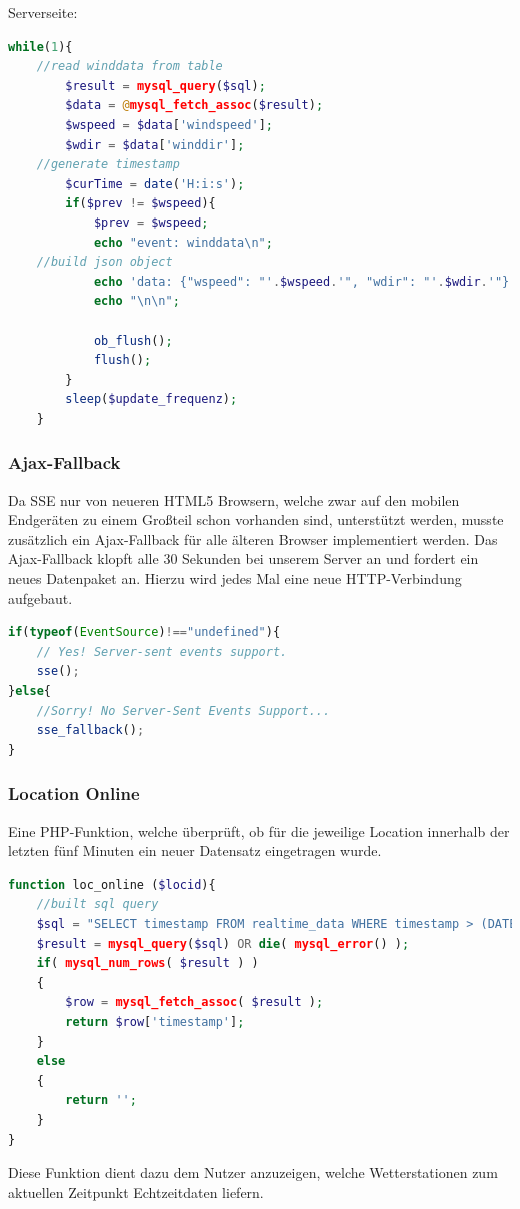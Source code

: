 \documentclass{report}
\begin{document}
Serverseite:
\begin{lstlisting}[language=PHP, caption=Server prüft auf neue Werte und pusht diese an den Client, label=cbsp3]
while(1){
	//read winddata from table
		$result = mysql_query($sql);
		$data = @mysql_fetch_assoc($result);
		$wspeed = $data['windspeed'];
		$wdir = $data['winddir'];
	//generate timestamp	
		$curTime = date('H:i:s');
		if($prev != $wspeed){
			$prev = $wspeed;
			echo "event: winddata\n";
	//build json object	
			echo 'data: {"wspeed": "'.$wspeed.'", "wdir": "'.$wdir.'"}';
			echo "\n\n";
		   
			ob_flush();
			flush();
		}
		sleep($update_frequenz);
	}
\end{lstlisting}

\subsubsection{Ajax-Fallback}
Da SSE nur von neueren HTML5 Browsern, welche zwar auf den mobilen Endgeräten zu einem Großteil schon vorhanden sind, unterstützt werden, musste zusätzlich ein Ajax-Fallback für alle älteren Browser implementiert werden.
Das Ajax-Fallback klopft alle 30 Sekunden bei unserem Server an und fordert ein neues Datenpaket an. Hierzu wird jedes Mal eine neue HTTP-Verbindung aufgebaut.
\begin{lstlisting}[language=JavaScript, caption=Werden SSE unterstützt?, label=cbsp4]
if(typeof(EventSource)!=="undefined"){
    // Yes! Server-sent events support.
    sse();
}else{
    //Sorry! No Server-Sent Events Support...
    sse_fallback();
}
\end{lstlisting}

\subsubsection{Location Online}
Eine PHP-Funktion, welche überprüft, ob für die jeweilige Location innerhalb der letzten fünf Minuten ein neuer Datensatz eingetragen wurde.
\begin{lstlisting}[language=PHP, caption=Ist die Location online?, label=cbsp5]
function loc_online ($locid){
	//built sql query
	$sql = "SELECT timestamp FROM realtime_data WHERE timestamp > (DATE_SUB(NOW(), INTERVAL 5 MINUTE)) AND loc_id='".$locid."'";
	$result = mysql_query($sql) OR die( mysql_error() );
	if( mysql_num_rows( $result ) )
	{
		$row = mysql_fetch_assoc( $result );
		return $row['timestamp'];
	}
	else
	{
		return '';
	}
}
\end{lstlisting}
Diese Funktion dient dazu dem Nutzer anzuzeigen, welche Wetterstationen zum aktuellen Zeitpunkt Echtzeitdaten liefern.
\end{document}

